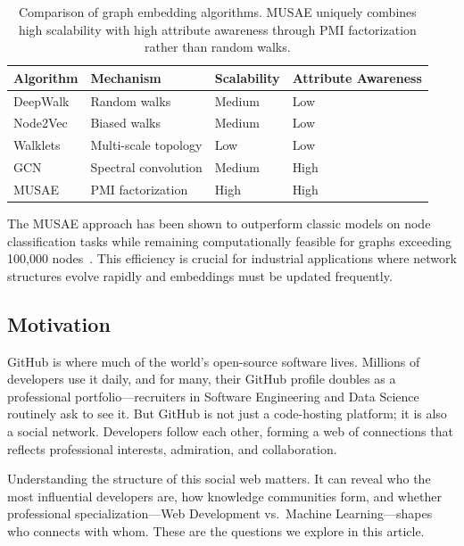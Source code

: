 \documentclass[letterpaper]{article}
\begin{document}
\begin{table}[H]
  \centering
  \begin{tabular}{llll}
    \toprule
    \textbf{Algorithm} & \textbf{Mechanism} & \textbf{Scalability} & \textbf{Attribute Awareness} \\
    \midrule
    DeepWalk   & Random walks          & Medium & Low  \\
    Node2Vec   & Biased walks          & Medium & Low  \\
    Walklets   & Multi-scale topology  & Low    & Low  \\
    GCN        & Spectral convolution  & Medium & High \\
    MUSAE      & PMI factorization     & High   & High \\
    \bottomrule
  \end{tabular}
  \caption{Comparison of graph embedding algorithms. MUSAE uniquely combines high scalability with high attribute awareness through PMI factorization rather than random walks.}
  \label{tab:embedding_algorithms}
\end{table}

The MUSAE approach has been shown to outperform classic models on node classification tasks while remaining computationally feasible for graphs exceeding 100,000 nodes~\cite{rozemberczki2021musae}. This efficiency is crucial for industrial applications where network structures evolve rapidly and embeddings must be updated frequently.

\subsection{Motivation}

GitHub is where much of the world's open-source software lives. Millions of developers use it daily, and for many, their GitHub profile doubles as a professional portfolio---recruiters in Software Engineering and Data Science routinely ask to see it. But GitHub is not just a code-hosting platform; it is also a social network. Developers follow each other, forming a web of connections that reflects professional interests, admiration, and collaboration.

Understanding the structure of this social web matters. It can reveal who the most influential developers are, how knowledge communities form, and whether professional specialization---Web Development vs.\ Machine Learning---shapes who connects with whom. These are the questions we explore in this article.
\end{document}
